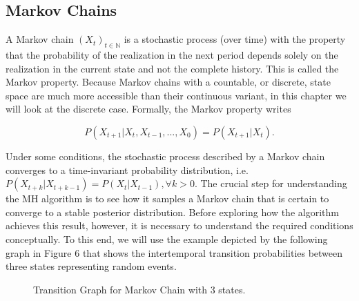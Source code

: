 \documentclass[12pt,english,a4paper,oneside]{article}
\theoremstyle{definition}
\theoremstyle{definition}
\theoremstyle{definition}
\theoremstyle{definition}
\theoremstyle{remark}
\begin{document}
\hypertarget{markov-chains}{%
\subsection{Markov Chains}\label{markov-chains}}

A Markov chain \((X_t)_{t \in \mathbb{N}}\) is a stochastic process (over time) with the property that the probability of the realization in the next period depends solely on the realization in the current state and not the complete history. This is called the Markov property. Because Markov chains with a countable, or discrete, state space are much more accessible than their continuous variant, in this chapter we will look at the discrete case. Formally, the Markov property writes

\begin{equation}
\label{eq:markov-property}
P(X_{t+1} |X_{t}, X_{t-1}, ..., X_{0}) = P(X_{t+1} |X_{t}).
\end{equation}

\noindent
Under some conditions, the stochastic process described by a Markov chain converges to a time-invariant probability distribution, i.e.~\(P(X_{t+k} |X_{t+k-1}) = P(X_{t} |X_{t-1}), \forall k>0\). The crucial step for understanding the MH algorithm is to see how it samples a Markov chain that is certain to converge to a stable posterior distribution. Before exploring how the algorithm achieves this result, however, it is necessary to understand the required conditions conceptually. To this end, we will use the example depicted by the following graph in Figure 6 that shows the intertemporal transition probabilities between three states representing random events.

\begin{figure}[H]
\label{fig:ex1}


\centering


\caption{Transition Graph for Markov Chain with 3 states.}
\end{figure}
\end{document}
